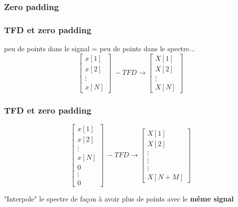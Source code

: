 \documentclass{beamer}
\begin{document}
\subsubsection{Zero padding}
\begin{frame}
\frametitle{TFD et zero padding}
peu de points dans le signal = peu de points dans le spectre...\\

\vspace{0.2cm}
\[
\begin{bmatrix} x[1] \\ x[2] \\ \vdots \\ x[N] \end{bmatrix} \; -TFD \rightarrow  
\begin{bmatrix} X[1] \\ X[2] \\ \vdots \\ X[N] \end{bmatrix}
\]


\end{frame} 

\begin{frame}
\frametitle{TFD et zero padding}

\[
\begin{bmatrix} x[1] \\ x[2] \\ \vdots \\ x[N] \\ 0 \\ \vdots \\ 0 \end{bmatrix} \; -TFD \rightarrow  
\begin{bmatrix} X[1] \\ X[2] \\ \vdots \\  \vdots \\  \vdots \\ X[N+M] \end{bmatrix}
\]
\vspace{0.5cm}

"Interpole" le spectre de façon à avoir plus de points avec le \textbf{même signal}
\end{frame}
\end{document}

